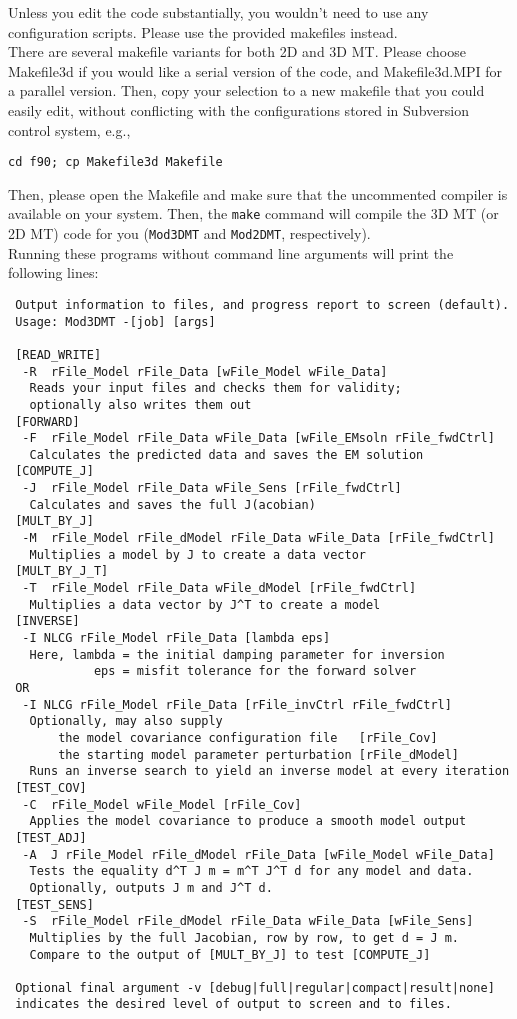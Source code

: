\documentclass[12pt]{article}
\begin{document}
Unless you edit the code substantially, you wouldn't need to use any configuration scripts. Please use the provided makefiles instead.\\

There are several makefile variants for both 2D and 3D MT. Please choose Makefile3d if you would like a serial version of the code, and Makefile3d.MPI for a parallel version. Then, copy your selection to a new makefile that you could easily edit, without conflicting with the configurations stored in Subversion control system, e.g.,
\begin{verbatim}
cd f90; cp Makefile3d Makefile
\end{verbatim}

Then, please open the Makefile and make sure that the uncommented compiler is available on your system. Then, the \verb"make" command will compile the 3D MT (or 2D MT) code for you (\verb"Mod3DMT" and \verb"Mod2DMT", respectively).\\

Running these programs without command line arguments will print the following lines:
\begin{verbatim}
 Output information to files, and progress report to screen (default).
 Usage: Mod3DMT -[job] [args]

 [READ_WRITE]
  -R  rFile_Model rFile_Data [wFile_Model wFile_Data]
   Reads your input files and checks them for validity;
   optionally also writes them out
 [FORWARD]
  -F  rFile_Model rFile_Data wFile_Data [wFile_EMsoln rFile_fwdCtrl]
   Calculates the predicted data and saves the EM solution
 [COMPUTE_J]
  -J  rFile_Model rFile_Data wFile_Sens [rFile_fwdCtrl]
   Calculates and saves the full J(acobian)
 [MULT_BY_J]
  -M  rFile_Model rFile_dModel rFile_Data wFile_Data [rFile_fwdCtrl]
   Multiplies a model by J to create a data vector
 [MULT_BY_J_T]
  -T  rFile_Model rFile_Data wFile_dModel [rFile_fwdCtrl]
   Multiplies a data vector by J^T to create a model
 [INVERSE]
  -I NLCG rFile_Model rFile_Data [lambda eps]
   Here, lambda = the initial damping parameter for inversion
            eps = misfit tolerance for the forward solver
 OR
  -I NLCG rFile_Model rFile_Data [rFile_invCtrl rFile_fwdCtrl]
   Optionally, may also supply
       the model covariance configuration file   [rFile_Cov]
       the starting model parameter perturbation [rFile_dModel]
   Runs an inverse search to yield an inverse model at every iteration
 [TEST_COV]
  -C  rFile_Model wFile_Model [rFile_Cov]
   Applies the model covariance to produce a smooth model output
 [TEST_ADJ]
  -A  J rFile_Model rFile_dModel rFile_Data [wFile_Model wFile_Data]
   Tests the equality d^T J m = m^T J^T d for any model and data.
   Optionally, outputs J m and J^T d.
 [TEST_SENS]
  -S  rFile_Model rFile_dModel rFile_Data wFile_Data [wFile_Sens]
   Multiplies by the full Jacobian, row by row, to get d = J m.
   Compare to the output of [MULT_BY_J] to test [COMPUTE_J]

 Optional final argument -v [debug|full|regular|compact|result|none]
 indicates the desired level of output to screen and to files.

\end{verbatim}
\end{document}

